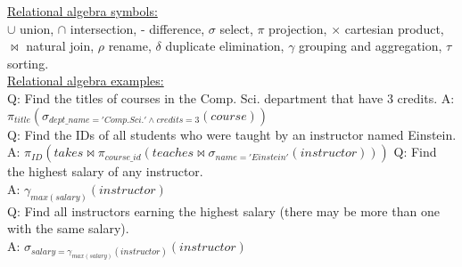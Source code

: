 \documentclass[a4paper,8pt,twocolumn]{extarticle}
\begin{document}
\noindent \underline{Relational algebra symbols:}\\
$\cup$ union, $\cap$ intersection, - difference, $\sigma$ select, $\pi$ projection, × cartesian product, $\bowtie$ natural join, $\rho$ rename, $\delta$ duplicate elimination, $\gamma$ grouping and aggregation, $\tau$ sorting.\\
\underline{Relational algebra examples:}\\
Q: Find the titles of courses in the Comp. Sci. department that have 3 credits. A: $\pi_{title}(\sigma_{dept\_name='Comp. Sci.' \land credits=3}(course))$ \\
Q: Find the IDs of all students who were taught by an instructor named Einstein.\\
A: $\pi_{ID}(takes \bowtie \pi_{course\_id}(teaches \bowtie \sigma_{name='Einstein'}(instructor)))$
Q: Find the highest salary of any instructor.\\
A: $\gamma_{max(salary)}(instructor)$\\
Q: Find all instructors earning the highest salary (there may be more than one with the same salary).\\
A: $\sigma_{salary=\gamma_{max(salary)}(instructor)}(instructor)$
\end{document}
